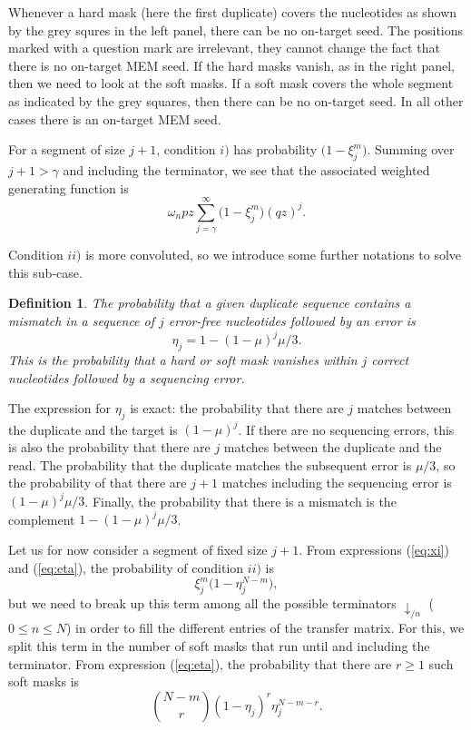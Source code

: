 \documentclass{article}
\newtheorem{definition}{Definition}
\begin{document}
Whenever a hard mask (here the first duplicate) covers the nucleotides as
shown by the grey squres in the left panel, there can be no on-target
seed. The positions marked with a question mark are irrelevant, they
cannot change the fact that there is no on-target MEM seed. If the hard
masks vanish, as in the right panel, then we need to look at the soft
masks. If a soft mask covers the whole segment as indicated by the grey
squares, then there can be no on-target seed. In all other cases there is
an on-target MEM seed.

For a segment of size $j+1$, condition $i)$ has probability $\big(1 -
\xi_j^m \big)$. Summing over $j+1 > \gamma$ and including the terminator,
we see that the associated weighted generating function is
\begin{equation*}
\omega_n pz \sum_{j=\gamma}^\infty \Big(1 - \xi_j^m \Big) (qz)^j.
\end{equation*}

Condition $ii)$ is more convoluted, so we introduce some further
notations to solve this sub-case.
\begin{definition}
The probability that a given duplicate sequence contains a mismatch in a
sequence of $j$ error-free nucleotides followed by an error is
\begin{equation}
\label{eq:eta}
\eta_j = 1-(1-\mu)^j\mu/3.
\end{equation}
This is the probability that a hard or soft mask vanishes within $j$
correct nucleotides followed by a sequencing error.
\end{definition}

The expression for $\eta_j$ is exact: the probability that there are $j$
matches between the duplicate and the target is $(1-\mu)^j$. If there are
no sequencing errors, this is also the probability that there are $j$
matches between the duplicate and the read. The probability that the
duplicate matches the subsequent error is $\mu/3$, so the probability of
that there are $j+1$ matches including the sequencing error is
$(1-\mu)^j\mu/3$. Finally, the probability that there is a mismatch is the
complement $1-(1-\mu)^j\mu/3$.

Let us for now consider a segment of fixed size $j+1$. From expressions
(\ref{eq:xi}) and (\ref{eq:eta}), the probability of condition $ii)$ is
\begin{equation*}
\xi_j^m \Big(1 - \eta_j^{N-m} \Big),
\end{equation*}
but we need to break up this term among all the possible terminators
$\downarrow_{/n}$ ($0 \leq n \leq N$) in order to fill the different
entries of the transfer matrix. For this, we split this term in the number
of soft masks that run until and including the terminator. From expression
(\ref{eq:eta}), the probability that there are $r \geq 1$ such soft masks
is
\begin{equation}
\label{eq:softmasks_r}
{N-m \choose r} (1 - \eta_j)^r \eta_j^{N-m-r}.
\end{equation}
\end{document}
